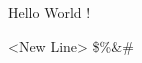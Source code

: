 \documentclass[a4paper]{article}
\begin{document}
Hello World !  %

<New Line>
\$\%\&\#
\end{document}
